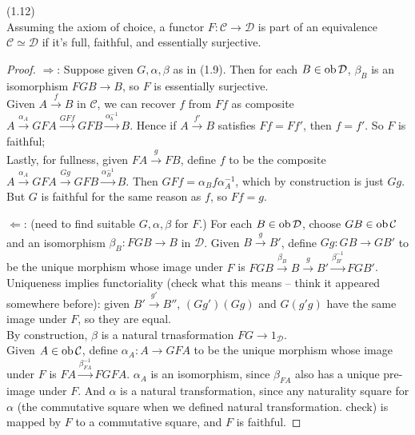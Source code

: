\documentclass[a4paper]{article}
\begin{document}
\begin{lemma} (1.12)\\
    Assuming the axiom of choice, a functor $F:\mathcal{C} \to \mathcal{D}$ is part of an equivalence $\mathcal{C} \simeq \mathcal{D}$ if it's full, faithful, and essentially surjective.
    \begin{proof}
        $\Rightarrow$: Suppose given $G,\alpha,\beta$ as in (1.9). Then for each $B \in \operatorname{ob}\mathcal{D}$, $\beta_B$ is an isomorphism $FGB \to B$, so $F$ is essentially surjective.\\
        Given $A \xrightarrow{f} B$ in $\mathcal{C}$, we can recover $f$ from $Ff$ as composite $A \xrightarrow{\alpha_A} GFA \xrightarrow{GFf} GFB \xrightarrow{\alpha_b^{-1}} B$. Hence if $A \xrightarrow{f'}B$ satisfies $Ff = Ff'$, then $f=f'$. So $F$ is faithful;\\
        Lastly, for fullness, given $FA \xrightarrow{g} FB$, define $f$ to be the composite $A \xrightarrow {\alpha_A} GFA \xrightarrow{Gg} GFB \xrightarrow{\alpha_B^{-1}} B$. Then $GFf = \alpha_B f \alpha_A^{-1}$, which by construction is just $Gg$. But $G$ is faithful for the same reason as $f$, so $Ff = g$.

        $\Leftarrow$: (need to find suitable $G,\alpha,\beta$ for $F$.) For each $B \in \operatorname{ob} \mathcal{D}$, choose $GB \in \operatorname{ob} \mathcal{C}$ and an isomorphism $\beta_B : FGB \to B$ in $\mathcal{D}$. Given $B \xrightarrow{g} B'$, define $Gg:GB \to GB'$ to be the unique morphism whose image under $F$ is $FGB \xrightarrow{\beta_B} B \xrightarrow{g} B' \xrightarrow{\beta_{B'}^{-1}} FGB'$.\\
        Uniqueness implies functoriality (check what this means -- think it appeared somewhere before): given $B' \xrightarrow{g'} B''$, $(Gg')(Gg)$ and $G(g'g)$ have the same image under $F$, so they are equal.\\
        By construction, $\beta$ is a natural trnasformation $FG \to 1_\mathcal{D}$.\\
        Given $A \in \operatorname{ob} \mathcal{C}$, define $\alpha_A: A \to GFA$ to be the unique morphism whose image under $F$ is $FA \xrightarrow{\beta_{FA}^{-1}} FGFA$. $\alpha_A$ is an isomorphism, since $\beta_{FA}$ also has a unique pre-image under $F$. And $\alpha$ is a natural transformation, since any naturality square for $\alpha$ (the commutative square when we defined natural transformation. check) is mapped by $F$ to a commutative square, and $F$ is faithful.
    \end{proof}
\end{lemma}
\end{document}

